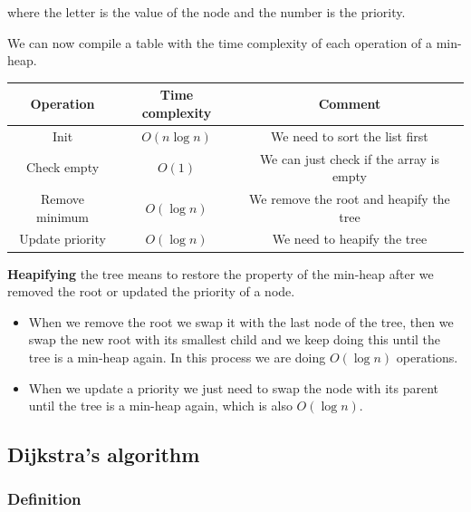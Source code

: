 \documentclass[10pt]{extarticle}
\begin{document}
where the letter is the value of the node and the number is the priority.

We can now compile a table with the time complexity of each operation of a min-heap.

\begin{center}
    \begin{tabular}{ |c|c|c| }
        \hline
        \textbf{Operation} & \textbf{Time complexity} & \textbf{Comment}                        \\
        \hline
        Init               & $O(n \log n)$            & We need to sort the list first          \\
        Check empty        & $O(1)$                   & We can just check if the array is empty \\
        Remove minimum     & $O(\log n)$              & We remove the root and heapify the tree \\
        Update priority    & $O(\log n)$              & We need to heapify the tree             \\
        \hline
    \end{tabular}
    \label{tab:minheap}
\end{center}

\textbf{Heapifying} the tree means to restore the property of the min-heap after we removed the root or updated the priority of a node.

\begin{itemize}
    \item
          When we remove the root we swap it with the last node of the tree, then we swap the new root with its smallest child and we keep doing this until the tree is a min-heap again.
          In this process we are doing $O(\log n)$ operations.
    \item
          When we update a priority we just need to swap the node with its parent until the tree is a min-heap again, which is also $O(\log n)$.
\end{itemize}

\subsection{Dijkstra's algorithm}

\subsubsection{Definition}
\end{document}
